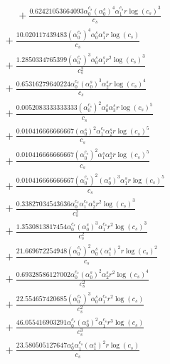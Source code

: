 \documentclass[10pt]{article}
\begin{document}
\begin{align*}
\phantom{R_{2,8}} &\phantom{={}}{}  + \frac{0.62421053664093 \alpha_{0}^{c_s} \left(\alpha_{0}^s\right)^{4} \alpha_{1}^{c_s} r \log{\left(c_{s} \right)}^{3}}{c_{s}} \\
&{}  + \frac{10.020117439483 \left(\alpha_{0}^{c_s}\right)^{4} \alpha_{0}^s \alpha_{1}^s r \log{\left(c_{s} \right)}}{c_{s}} \\
&{}  + \frac{1.2850334765399 \left(\alpha_{0}^{c_s}\right)^{3} \alpha_{0}^s \alpha_{1}^s r^{2} \log{\left(c_{s} \right)}^{3}}{c_{s}^{2}} \\
&{}  + \frac{0.65316279640224 \alpha_{0}^{c_s} \left(\alpha_{0}^s\right)^{3} \alpha_{2}^s r \log{\left(c_{s} \right)}^{4}}{c_{s}} \\
&{}  + \frac{0.0052083333333333 \left(\alpha_{0}^{c_s}\right)^{2} \alpha_{0}^s \alpha_{3}^s r \log{\left(c_{s} \right)}^{5}}{c_{s}} \\
&{}  + \frac{0.010416666666667 \left(\alpha_{0}^s\right)^{2} \alpha_{1}^{c_s} \alpha_{2}^s r \log{\left(c_{s} \right)}^{5}}{c_{s}} \\
&{}  + \frac{0.010416666666667 \left(\alpha_{0}^{c_s}\right)^{2} \alpha_{1}^s \alpha_{2}^s r \log{\left(c_{s} \right)}^{5}}{c_{s}} \\
&{}  + \frac{0.010416666666667 \left(\alpha_{0}^{c_s}\right)^{2} \left(\alpha_{0}^s\right)^{3} \alpha_{1}^s r \log{\left(c_{s} \right)}^{5}}{c_{s}} \\
&{}  + \frac{0.33827034543636 \alpha_{0}^{c_s} \alpha_{1}^{c_s} \alpha_{2}^s r^{2} \log{\left(c_{s} \right)}^{3}}{c_{s}^{2}} \\
&{}  + \frac{1.3530813817454 \alpha_{0}^{c_s} \left(\alpha_{0}^s\right)^{3} \alpha_{1}^{c_s} r^{2} \log{\left(c_{s} \right)}^{3}}{c_{s}^{2}} \\
&{}  + \frac{21.669672254948 \left(\alpha_{0}^{c_s}\right)^{2} \alpha_{0}^s \left(\alpha_{1}^s\right)^{2} r \log{\left(c_{s} \right)}^{2}}{c_{s}} \\
&{}  + \frac{0.69328586127002 \alpha_{0}^{c_s} \left(\alpha_{0}^s\right)^{2} \alpha_{2}^s r^{2} \log{\left(c_{s} \right)}^{4}}{c_{s}^{2}} \\
&{}  + \frac{22.554657420685 \left(\alpha_{0}^{c_s}\right)^{3} \alpha_{0}^s \alpha_{1}^{c_s} r^{2} \log{\left(c_{s} \right)}}{c_{s}^{2}} \\
&{}  + \frac{46.055416903291 \alpha_{0}^{c_s} \left(\alpha_{0}^s\right)^{2} \alpha_{1}^{c_s} r^{3} \log{\left(c_{s} \right)}}{c_{s}^{3}} \\
&{}  + \frac{23.580505127647 \alpha_{0}^s \alpha_{1}^{c_s} \left(\alpha_{1}^s\right)^{2} r \log{\left(c_{s} \right)}}{c_{s}} \\

\end{align*}
\end{document}

